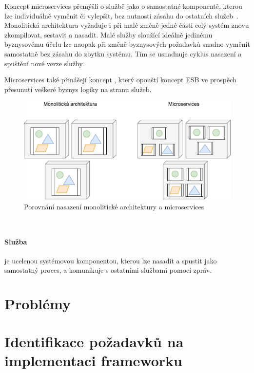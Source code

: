 Koncept microservices přemýšlí o službě jako o samostatné komponentě,
kterou lze individuálně vyměnit či vylepšit, bez nutnosti zásahu do
ostatních služeb~\cite{lewis2014microservices}. Monolitická architektura
vyžaduje i při malé změně jedné části celý systém znovu zkompilovat, sestavit
a nasadit. Malé služby sloužící ideálně jedinému byznysovému účelu lze naopak
při změně byznysových požadavků snadno vyměnit samostatně bez zásahu do zbytku
systému. Tím se usnaďnuje cyklus nasazení a spuštění nové verze služby.

Microservices také přinášejí koncept ,
který opouští koncept ESB ve prospěch přesunutí veškeré byznys logiky
na stranu služeb.


\begin{figure}
    \centering
    \includegraphics[keepaspectratio=true, width=0.8\linewidth]{figures/microservices-deployment.pdf}
    \caption{Porovnání nasazení monolitické architektury a microservices}
    \label{fig:microservices-deployment}
\end{figure}

~\cite{perrey2003service}
~\cite{cerny2017disambiguation}
~\cite{sprott2004understanding}

\paragraph{Služba} je ucelenou systémovou komponentou,
kterou lze nasadit a spustit jako samostatný proces, a
komunikuje s ostatními službami pomocí zpráv.

\section{Problémy}

\section{Identifikace požadavků na implementaci frameworku}

